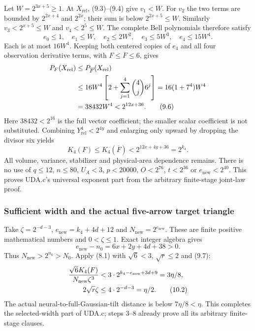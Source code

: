 \documentclass[11pt]{article}
\theoremstyle{plain}
\theoremstyle{definition}
\theoremstyle{remark}
\begin{document}
Let $W=2^{3x+5}\ge1$. At $X_{\mathrm{rel}}$, (9.3)--(9.4) give $v_1<W$.
For $v_2$ the two terms are bounded by $2^{2x+4}$ and $2^{2x}$; their
sum is below $2^{2x+5}\le W$. Similarly $v_3<2^{x+5}\le W$ and
$v_4<2^5\le W$. The complete Bell polynomials therefore satisfy
\[
 e_0\le1,\quad e_1\le W,\quad e_2\le2W^2,\quad e_3\le5W^3,
 \quad e_4\le15W^4.
\]
Each is at most $16W^4$. Keeping both centered copies of $e_4$ and all
four observation derivative terms, with $F\le\overline F\le6$, gives
\begin{align}
 P_F(X_{\mathrm{rel}})&\le P_{\overline F}(X_{\mathrm{rel}})\notag\\
 &\le16W^4\left[2+\sum_{j=1}^4\binom4j6^j\right]
 =16(1+7^4)W^4\notag\\
 &=38432W^4<2^{12x+36}.\tag{9.6}
\end{align}
Here $38432<2^{16}$ is the full vector coefficient; the smaller scalar
coefficient is not substituted. Combining $Y_{\mathrm{rel}}^4<2^{4y}$
and enlarging only upward by dropping the divisor six yields
\begin{equation}
 K_4(F)\le K_4(\overline F)<2^{12x+4y+36}=2^{k_4}.\tag{9.7}
\end{equation}
All volume, variance, stabilizer and physical-area dependence remains.
There is no use of $q\le12$, $n\le80$, $U_A<3$, $p<20000$,
$O<2^{76}$, $t<2^{36}$ or $e_{\mathrm{new}}<2^{40}$.
This proves UDA.c's universal exponent part from the arbitrary finite-stage
joint-law proof.

\subsubsection{Sufficient width and the actual five-arrow target triangle}
Take $\zeta=2^{-d-3}$, $e_{\mathrm{new}}=k_4+4d+12$ and
$N_{\mathrm{new}}=2^{e_{\mathrm{new}}}$. These are finite positive
mathematical numbers and $0<\zeta\le1$. Exact integer algebra gives
\begin{equation}
 e_{\mathrm{new}}-n_0=6x+2y+4d+38>0.\tag{10.1}
\end{equation}
Thus $N_{\mathrm{new}}>2^{n_0}>N_0$. Apply (8.1) with $\sqrt6<3$,
$\sqrt r\le2$ and (9.7):
\begin{align}
 \frac{\sqrt6K_4(F)}{N_{\mathrm{new}}\zeta^3}
 &<3\cdot2^{k_4-e_{\mathrm{new}}+3d+9}=3\eta/8,\notag\\
 2\sqrt r\zeta&\le4\cdot2^{-d-3}=\eta/2.\tag{10.2}
\end{align}
The actual neural-to-full-Gaussian-tilt distance is below $7\eta/8<\eta$.
This completes the selected-width part of UDA.c; steps 3--8 already prove
all its arbitrary finite-stage clauses.
\end{document}
